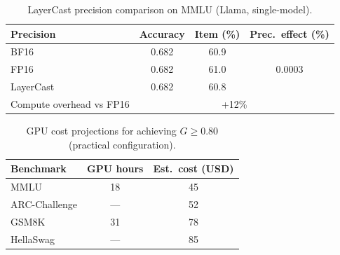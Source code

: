 \documentclass[11pt,letterpaper]{article}
\begin{document}
\begin{table}[h]
\centering
\caption{LayerCast precision comparison on MMLU (Llama, single-model).}
\label{tab:layercast}
\small
\begin{tabular}{lccc}
\toprule
\textbf{Precision} & \textbf{Accuracy} & \textbf{Item (\%)} & \textbf{Prec.\ effect (\%)} \\
\midrule
BF16 & 0.682 & 60.9 & \multirow{3}{*}{0.0003} \\
FP16 & 0.682 & 61.0 & \\
LayerCast & 0.682 & 60.8 & \\
\midrule
Compute overhead vs FP16 & \multicolumn{3}{c}{+12\%} \\
\bottomrule
\end{tabular}
\end{table}

\begin{table}[h]
\centering
\caption{GPU cost projections for achieving $G \geq 0.80$ (practical configuration).}
\label{tab:gpu_cost}
\small
\begin{tabular}{lcc}
\toprule
\textbf{Benchmark} & \textbf{GPU hours} & \textbf{Est.\ cost (USD)} \\
\midrule
MMLU & 18 & 45 \\
ARC-Challenge & --- & 52 \\
GSM8K & 31 & 78 \\
HellaSwag & --- & 85 \\
\bottomrule
\end{tabular}
\end{table}
\end{document}
